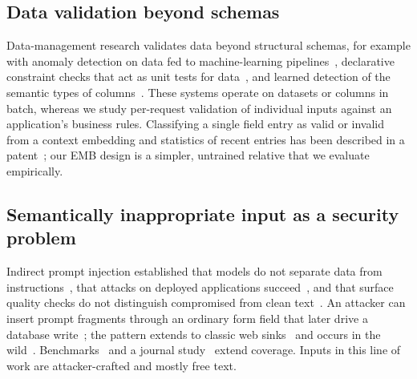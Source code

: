 \documentclass[conference]{IEEEtran}
\begin{document}
\subsection{Data validation beyond schemas}
Data-management research validates data beyond structural schemas, for example with anomaly
detection on data fed to machine-learning pipelines~\cite{breck2019datavalidation}, declarative
constraint checks that act as unit tests for data~\cite{schelter2018deequ}, and learned detection of
the semantic types of columns~\cite{hulsebos2019sherlock}. These systems operate on datasets or columns
in batch, whereas we study per-request validation of individual inputs against an application's
business rules. Classifying a single field entry as valid or invalid from a context embedding and
statistics of recent entries has been described in a patent~\cite{banerjee2025contextembedding}; our
EMB design is a simpler, untrained relative that we evaluate empirically.

\subsection{Semantically inappropriate input as a security problem}
Indirect prompt injection established that models do not separate data from
instructions~\cite{greshake2023indirect}, that attacks on deployed applications
succeed~\cite{liu2023houyi,kaya2026chatbotplugins}, and that surface quality checks do not distinguish
compromised from clean text~\cite{liu2024formalizing}. An attacker can insert prompt fragments through
an ordinary form field that later drive a database write~\cite{pedro2025p2sql}; the pattern extends to
classic web sinks~\cite{tsigkopoulos2026webexploitation} and occurs in the wild~\cite{khodayari2026ipiwild}.
Benchmarks~\cite{yi2025bipia,evtimov2025wasp,liu2025wainjectbench} and a journal
study~\cite{milani2026ipi} extend coverage. Inputs in this line of work are attacker-crafted and mostly
free text.
\end{document}
